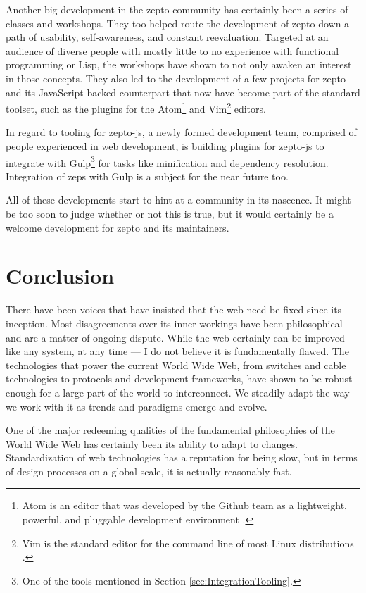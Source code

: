 \documentclass[oneside,11pt,xetex]{scrbook}
\begin{document}
Another big development in the zepto community has certainly been a series of
classes and workshops. They too helped route the development of zepto down
a path of usability, self-awareness, and constant reevaluation. Targeted at an
audience of diverse people with mostly little to no experience with functional
programming or Lisp, the workshops have shown to not only awaken an interest in those
concepts. They also led to the development of a few projects for zepto and its
JavaScript-backed counterpart that now have become part of the standard toolset,
such as the plugins for the Atom\footnote{Atom is an editor that was developed by
the Github team as a lightweight, powerful, and pluggable development environment
\parencite{ATOM}.} and Vim\footnote{Vim is the standard editor for the command line
of most Linux distributions \parencite{VIM}.} editors.

In regard to tooling for zepto-js, a newly formed development team, comprised of
people experienced in web development, is building plugins for zepto-js to integrate
with Gulp\footnote{One of the tools mentioned in Section \ref{sec:IntegrationTooling}.} for
tasks like minification and dependency resolution. Integration of \gls{zeps} with
Gulp is a subject for the near future too.

All of these developments start to hint at a community in its nascence. It might
be too soon to judge whether or not this is true, but it would certainly be a welcome
development for zepto and its maintainers.

\chapter{Conclusion}
\label{chap:conclusion}

There have been voices that have insisted that the web need be fixed
since its inception. Most disagreements over its inner workings
have been philosophical and are a matter of ongoing dispute.
While the web certainly can be improved --- like any system,
at any time --- I do not believe it is fundamentally flawed. The
technologies that power the current World Wide Web, from switches
and cable technologies to protocols and development frameworks,
have shown to be robust enough for a large part of the world
to interconnect. We steadily adapt the way we work with it
as trends and paradigms emerge and evolve.

One of the major redeeming qualities of the fundamental
philosophies of the World Wide Web has certainly been
its ability to adapt to changes. Standardization of web
technologies has a reputation for being slow, but in terms
of design processes on a global scale, it is actually reasonably
fast.
\end{document}

